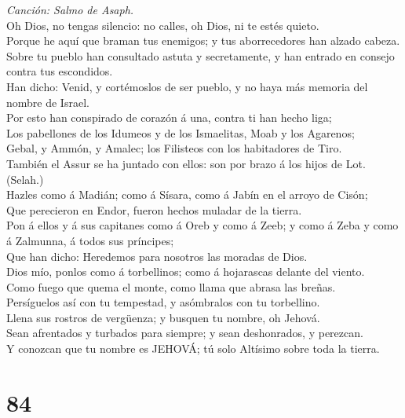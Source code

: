  \emph{Canción: Salmo de Asaph.}\\
Oh Dios, no tengas silencio: no calles, oh Dios, ni te estés quieto.\\
 Porque he aquí que braman tus enemigos; y tus aborrecedores
han alzado cabeza.\\
 Sobre tu pueblo han consultado astuta y secretamente, y han
entrado en consejo contra tus escondidos.\\
 Han dicho: Venid, y cortémoslos de ser pueblo, y no haya
más memoria del nombre de Israel.\\
 Por esto han conspirado de corazón á una, contra ti han
hecho liga;\\
 Los pabellones de los Idumeos y de los Ismaelitas, Moab y
los Agarenos;\\
 Gebal, y Ammón, y Amalec; los Filisteos con los habitadores
de Tiro.\\
 También el Assur se ha juntado con ellos: son por brazo á
los hijos de Lot. (Selah.)\\
 Hazles como á Madián; como á Sísara, como á Jabín en el
arroyo de Cisón;\\
 Que perecieron en Endor, fueron hechos muladar de la
tierra.\\
 Pon á ellos y á sus capitanes como á Oreb y como á Zeeb; y
como á Zeba y como á Zalmunna, á todos sus príncipes;\\
 Que han dicho: Heredemos para nosotros las moradas de
Dios.\\
 Dios mío, ponlos como á torbellinos; como á hojarascas
delante del viento.\\
 Como fuego que quema el monte, como llama que abrasa las
breñas.\\
 Persíguelos así con tu tempestad, y asómbralos con tu
torbellino.\\
 Llena sus rostros de vergüenza; y busquen tu nombre, oh
Jehová.\\
 Sean afrentados y turbados para siempre; y sean
deshonrados, y perezcan.\\
 Y conozcan que tu nombre es JEHOVÁ; tú solo Altísimo sobre
toda la tierra.

\hypertarget{section-83}{%
\section{84}\label{section-83}}

